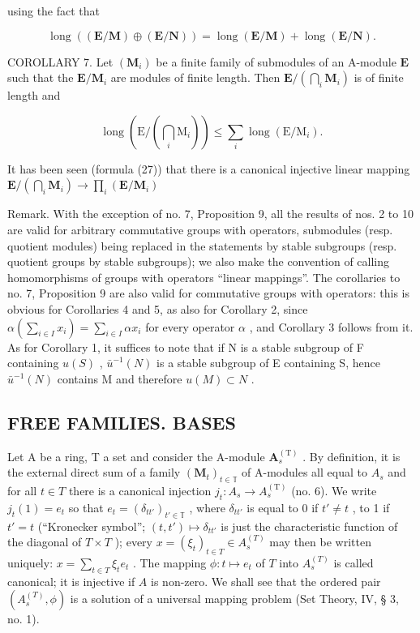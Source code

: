 using the fact that

\[
\operatorname{long} ((\mathbf {E} / \mathbf {M}) \oplus (\mathbf {E} / \mathbf {N})) = \operatorname{long} (\mathbf {E} / \mathbf {M}) + \operatorname{long} (\mathbf {E} / \mathbf {N}).
\]

COROLLARY 7. Let \((\mathbf{M}_i)\) be a finite family of submodules of an A-module \(\mathbf{E}\) such that the \(\mathbf{E} / \mathbf{M}_i\) are modules of finite length. Then \(\mathbf{E} / (\bigcap_{i} \mathbf{M}_i)\) is of finite length and

\[
\operatorname{long} \left(\mathrm{E} / \left(\bigcap_ {i} \mathrm{M} _ {i}\right)\right) \leqslant \sum_ {i} \operatorname{long} (\mathrm{E} / \mathrm{M} _ {i}).\tag{42}
\]

It has been seen (formula (27)) that there is a canonical injective linear mapping \(\mathbf{E} / \left(\bigcap_{i}\mathbf{M}_{i}\right)\to \prod_{i}(\mathbf{E} / \mathbf{M}_{i})\)

Remark. With the exception of no. 7, Proposition 9, all the results of nos. 2 to 10 are valid for arbitrary commutative groups with operators, submodules (resp. quotient modules) being replaced in the statements by stable subgroups (resp. quotient groups by stable subgroups); we also make the convention of calling homomorphisms of groups with operators ``linear mappings''. The corollaries to no. 7, Proposition 9 are also valid for commutative groups with operators: this is obvious for Corollaries 4 and 5, as also for Corollary 2, since \(\alpha\left(\sum_{i\in I}x_i\right)=\sum_{i\in I}\alpha x_i\) for every operator \(\alpha\) , and Corollary 3 follows from it. As for Corollary 1, it suffices to note that if N is a stable subgroup of F containing \(u(S)\) , \(\bar{u}^{-1}(N)\) is a stable subgroup of E containing S, hence \(\bar{u}^{-1}(N)\) contains M and therefore \(u(M)\subset N\) .

\subsection{FREE FAMILIES. BASES}

Let A be a ring, T a set and consider the A-module \(\mathbf{A}_{s}^{\mathrm{(T)}}\) . By definition, it is the external direct sum of a family \((\mathbf{M}_{t})_{t\in\mathbb{T}}\) of A-modules all equal to \(A_{s}\) and for all \(t\in T\) there is a canonical injection \(j_{t}:A_{s}\to A_{s}^{\mathrm{(T)}}\) (no. 6). We write \(j_{t}(1) = e_{t}\) so that \(e_{t} = (\delta_{tt'})_{t' \in \mathbb{T}}\) , where \(\delta_{tt'}\) is equal to 0 if \(t' \neq t\) , to 1 if \(t' = t\) (``Kronecker symbol''; \((t, t') \mapsto \delta_{tt'}\) is just the characteristic function of the diagonal of \(T \times T\) ); every \(x = (\xi_{t})_{t \in T} \in A_{s}^{(T)}\) may then be written uniquely: \(x = \sum_{t \in T} \xi_{t} e_{t}\) . The mapping \(\phi: t \mapsto e_{t}\) of \(T\) into \(A_{s}^{(T)}\) is called canonical; it is injective if \(A\) is non-zero. We shall see that the ordered pair \((A_{s}^{(T)}, \phi)\) is a solution of a universal mapping problem (Set Theory, IV, § 3, no. 1).

